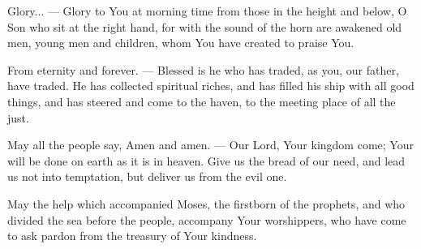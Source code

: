 \documentclass[12pt,twoside,a5paper]{article}
\begin{document}
\begin{halfparskip}
  Glory... --- Glory to You at morning time from those in the height and below, O Son who sit at the right hand, for with the sound of the horn are awakened old men, young men and children, whom You have created to praise You.

  From eternity and forever. --- Blessed is he who has traded, as you, our father, have traded. He has collected spiritual riches, and has filled his ship with all good things, and has steered and come to the haven, to the meeting place of all the just.

  May all the people say, Amen and amen. --- Our Lord, Your kingdom come; Your will be done on earth as it is in heaven. Give us the bread of our need, and lead us not into temptation, but deliver us from the evil one.

  May the help which accompanied Moses, the firstborn of the prophets, and who divided the sea before the people, accompany Your worshippers, who have come to ask pardon from the treasury of Your kindness.
\end{halfparskip}

\end{document}
